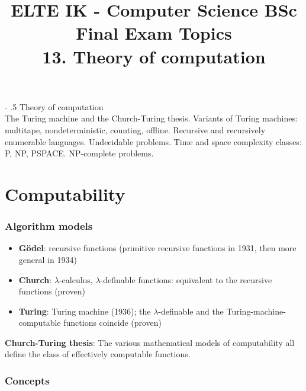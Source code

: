 \documentclass[margin=0px]{article}
\title{\textbf{{\Large ELTE IK - Computer Science BSc} \vspace{0.2cm} \\ {\huge Final Exam Topics}} \vspace{0.3cm} \\ 13. Theory of computation}
\author{}
\date{}
\makeatletter
\renewcommand\paragraph{%
	\@startsection{paragraph}{4}{0mm}%
	{-\baselineskip}%
	{.5\baselineskip}%
	{\normalfont\normalsize\bfseries}}
\newenvironment{tetel}[1]{\paragraph{#1 \\}}{}
\makeatother
\begin{document}
\maketitle

\begin{center}
\end{center}

\begin{tetel}{Theory of computation}
    The Turing machine and the Church-Turing thesis. Variants of Turing machines: multitape, nondeterministic, counting, offline. Recursive and recursively enumerable languages. Undecidable problems. Time and space complexity classes: P, NP, PSPACE. NP-complete problems.
\end{tetel}

\section{Computability}

\subsubsection{Algorithm models}

\begin{itemize}
    \item	\textbf{Gödel}: recursive functions (primitive recursive functions in 1931, then more general in 1934)

    \item	\textbf{Church}: $\lambda$-calculus, $\lambda$-definable functions: equivalent to the recursive functions (proven)

    \item	\textbf{Turing}: Turing machine (1936); the $\lambda$-definable and the Turing-machine-computable functions coincide (proven)

\end{itemize}

\noindent \textbf{Church-Turing thesis}: The various mathematical models of computability all define the class of effectively
computable functions.

\subsubsection{Concepts}
\end{document}
